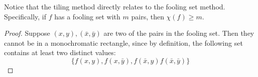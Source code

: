 \documentclass[12pt]{article}
\begin{document}
Notice that the tiling method directly relates to the fooling set method.
Specifically, if $f$ has a fooling set with $m$ pairs, then $\chi(f) \geq m$.
\begin{proof}
Suppose $(x, y), (\bar{x}, \bar{y})$ are two of the pairs in the fooling set.
Then they cannot be in a monochromatic rectangle, since by definition, the following set contains at least
two distinct values:
\[\big\{ f(x, y), 
         f(x, \bar{y}),
         f(\bar{x}, y)
         f(\bar{x}, \bar{y}) \big\}\]
\end{proof}


% 
% 
\end{document}
